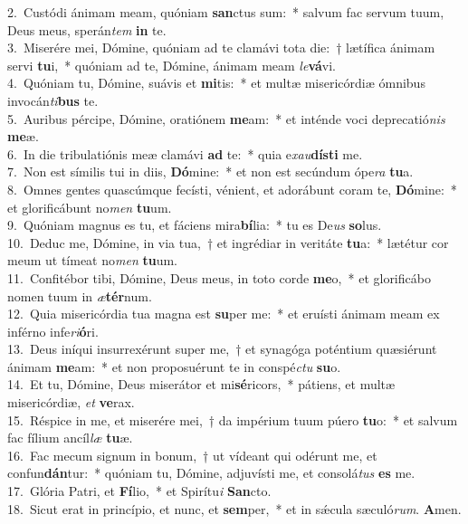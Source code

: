 {2.~}Custódi ánimam meam, quóniam \textbf{san}ctus sum:~* salvum fac servum tuum, Deus meus, sperán\textit{tem} \textbf{in} te.\\
{3.~}Miserére mei, Dómine, quóniam ad te clamávi tota die:~† lætífica ánimam servi \textbf{tu}i,~* quóniam ad te, Dómine, ánimam meam \textit{le}\textbf{vá}vi.\\
{4.~}Quóniam tu, Dómine, suávis et \textbf{mi}tis:~* et multæ misericórdiæ ómnibus invocán\textit{ti}\textbf{bus} te.\\
{5.~}Auribus pércipe, Dómine, oratiónem \textbf{me}am:~* et inténde voci deprecatió\textit{nis} \textbf{me}æ.\\
{6.~}In die tribulatiónis meæ clamávi \textbf{ad} te:~* quia e\textit{xau}\textbf{dí}\textbf{sti} me.\\
{7.~}Non est símilis tui in diis, \textbf{Dó}mine:~* et non est secúndum ópe\textit{ra} \textbf{tu}a.\\
{8.~}Omnes gentes quascúmque fecísti, vénient, et adorábunt coram te, \textbf{Dó}mine:~* et glorificábunt no\textit{men} \textbf{tu}um.\\
{9.~}Quóniam magnus es tu, et fáciens mira\textbf{bí}lia:~* tu es De\textit{us} \textbf{so}lus.\\
{10.~}Deduc me, Dómine, in via tua,~† et ingrédiar in veritáte \textbf{tu}a:~* lætétur cor meum ut tímeat no\textit{men} \textbf{tu}um.\\
{11.~}Confitébor tibi, Dómine, Deus meus, in toto corde \textbf{me}o,~* et glorificábo nomen tuum in \textit{æ}\textbf{tér}num.\\
{12.~}Quia misericórdia tua magna est \textbf{su}per me:~* et eruísti ánimam meam ex inférno infe\textit{ri}\textbf{ó}ri.\\
{13.~}Deus iníqui insurrexérunt super me,~† et synagóga poténtium quæsiérunt ánimam \textbf{me}am:~* et non proposuérunt te in conspé\textit{ctu} \textbf{su}o.\\
{14.~}Et tu, Dómine, Deus miserátor et mi\textbf{sé}ricors,~* pátiens, et multæ misericórdiæ, \textit{et} \textbf{ve}rax.\\
{15.~}Réspice in me, et miserére mei,~† da impérium tuum púero \textbf{tu}o:~* et salvum fac fílium ancíl\textit{læ} \textbf{tu}æ.\\
{16.~}Fac mecum signum in bonum,~† ut vídeant qui odérunt me, et confun\textbf{dán}tur:~* quóniam tu, Dómine, adjuvísti me, et consolá\textit{tus} \textbf{es} me.\\
{17.~}Glória Patri, et \textbf{Fí}lio,~* et Spirítu\textit{i} \textbf{San}cto.\\
{18.~}Sicut erat in princípio, et nunc, et \textbf{sem}per,~* et in sǽcula sæculó\textit{rum}. \textbf{A}men.\\
